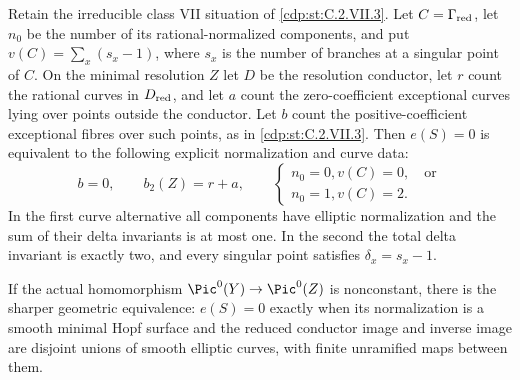 
\begin{proposition}\label{cdp:st:C.2.VII.4}

Retain the irreducible class VII situation of
\ref{cdp:st:C.2.VII.3}. Let $C=\Gamma_{\rm red}$, let $n_0$
be the number of its rational-normalized components,
and put $v(C)=\sum_x(s_x-1)$, where $s_x$ is the
number of branches at a singular point of $C$.
On the minimal resolution $Z$ let $D$ be the
resolution conductor, let $r$ count the rational
curves in $D_{\rm red}$, and let $a$ count the
zero-coefficient exceptional curves lying over
points outside the conductor. Let $b$ count the
positive-coefficient exceptional fibres over
such points, as in \ref{cdp:st:C.2.VII.3}. Then $e(S)=0$
is equivalent to the following explicit
normalization and curve data:
\[
 b=0,\qquad b_2(Z)=r+a,
 \qquad
 \begin{cases}
 n_0=0, v(C)=0,\quad\text{or}\\
 n_0=1, v(C)=2.
 \end{cases}
 \tag{C.VII.9}\label{cdp:eq:C.VII.9}
\]
In the first curve alternative all components
have elliptic normalization and the sum of
their delta invariants is at most one. In the
second the total delta invariant is exactly
two, and every singular point satisfies
$\delta_x=s_x-1$.

If the actual homomorphism
$\Pic^0(Y)\to\Pic^0(Z)$ is nonconstant,
there is the sharper geometric equivalence:
$e(S)=0$ exactly when its normalization is a
smooth minimal Hopf surface and the reduced
conductor image and inverse image are disjoint
unions of smooth elliptic curves, with finite
unramified maps between them.
\end{proposition}

